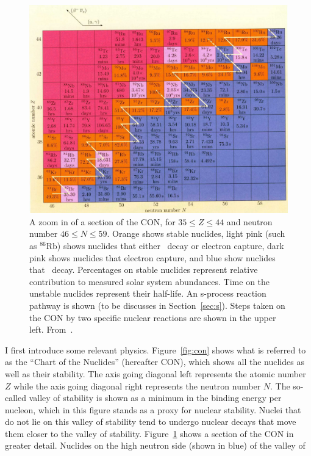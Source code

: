 \begin{figure}
\includegraphics[width=\linewidth]{pdf/con2.png}
\caption{\label{fig:con2} A zoom in of a section of the CON, for
  $35\leq Z \leq 44$ and neutron number $46\leq N \leq 59$.  Orange shows stable
  nuclides, light pink (such as $^{86}$Rb) shows nuclides that either
  \bminus\ decay or electron capture, dark pink shows nuclides that
  electron capture, and blue show nuclides that \bminus\ decay.
  Percentages on stable nuclides represent relative contribution to
  measured solar system abundances.  Time on the unstable nuclides
  represent their half-life.  An s-process reaction pathway is shown
  (to be discusses in Section~\ref{sec:s}). Steps taken on the CON by
  two specific nuclear reactions are shown in the upper left.  From~\cite{ryan2010}.}
\end{figure}
I first introduce some relevant physics.  Figure~\ref{fig:con}
shows what is referred to as the ``Chart of the Nuclides'' (hereafter
CON), which
shows all the nuclides as well as their stability.  The axis going diagonal left represents the atomic number $Z$ while the
axis going diagonal right represents the neutron number $N$.  The
so-called valley of stability is shown as a minimum in the binding
energy per nucleon, which in this figure stands as a proxy for nuclear
stability. Nuclei that do not lie on this valley of stability tend to
undergo nuclear decays that move them closer to the valley of
stability.  Figure~\ref{fig:con2} shows a section of the CON in
greater detail.  Nuclides on the high neutron side (shown in blue) of the valley of
